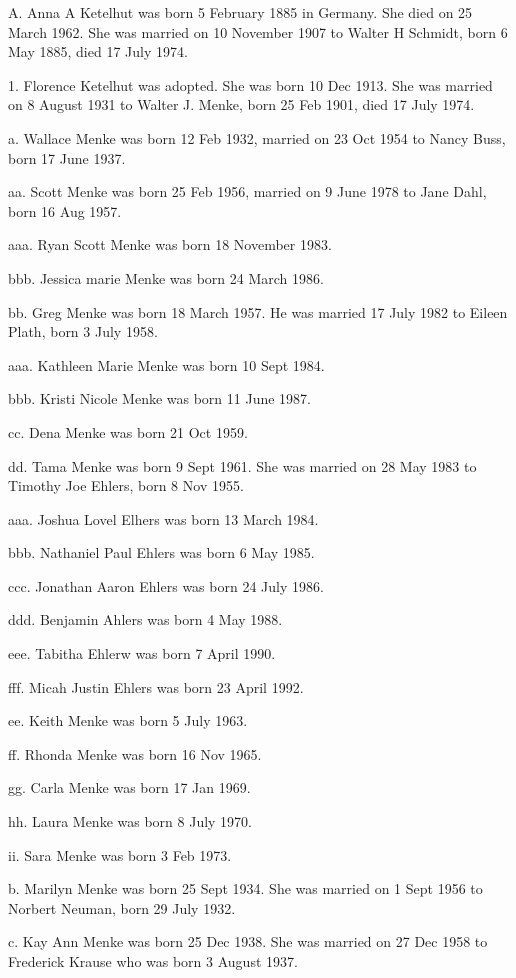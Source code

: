 \documentclass[a4paper]{article}
\begin{document}
A. Anna A Ketelhut was born 5 February 1885 in Germany.  She died on 25 March 1962. She was married on 10 November 1907 to Walter H Schmidt, born 6 May 1885, died 17 July 1974.

1. Florence Ketelhut was adopted.  She was born 10 Dec 1913.  She was married on 8 August 1931 to Walter J. Menke, born 25 Feb 1901, died 17 July 1974.

a. Wallace Menke was born 12 Feb 1932, married on 23 Oct 1954 to Nancy Buss, born 17 June 1937.

aa. Scott Menke was born 25 Feb 1956, married on 9 June 1978 to Jane Dahl, born 16 Aug 1957.

aaa. Ryan Scott Menke was born 18 November 1983.

bbb. Jessica marie Menke was born 24 March 1986.

bb. Greg Menke was born 18 March 1957.  He was married 17 July 1982 to Eileen Plath, born 3 July 1958.

aaa. Kathleen Marie Menke was born 10 Sept 1984.

bbb. Kristi Nicole Menke was born 11 June 1987.

cc. Dena Menke was born 21 Oct 1959.

dd. Tama Menke was born 9 Sept 1961.  She was married on 28 May 1983 to Timothy Joe Ehlers, born 8 Nov 1955.

aaa. Joshua Lovel Elhers was born 13 March 1984.

bbb. Nathaniel Paul Ehlers was born 6 May 1985.

ccc. Jonathan Aaron Ehlers was born 24 July 1986.

ddd. Benjamin Ahlers was born 4 May 1988.

eee. Tabitha Ehlerw was born 7 April 1990.

fff. Micah Justin Ehlers was born 23 April 1992.

ee. Keith Menke was born 5 July 1963.

ff. Rhonda Menke was born 16 Nov 1965.

gg. Carla Menke was born 17 Jan 1969.

hh. Laura Menke was born 8 July 1970.

ii. Sara Menke was born 3 Feb 1973.

b. Marilyn Menke was born 25 Sept 1934.  She was married on 1 Sept 1956 to Norbert Neuman, born 29 July 1932.

c. Kay Ann Menke was born 25 Dec 1938.  She was married on 27 Dec 1958 to Frederick Krause who was born 3 August 1937.
\end{document}
